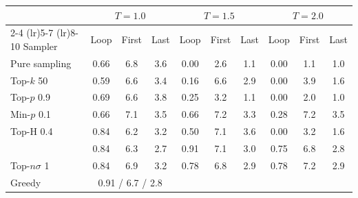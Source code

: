 \begin{tabular}{lccccccccc}
\toprule
 & \multicolumn{3}{c}{$T{=}1.0$} & \multicolumn{3}{c}{$T{=}1.5$} & \multicolumn{3}{c}{$T{=}2.0$} \\
\cmidrule(lr){2-4} \cmidrule(lr){5-7} \cmidrule(lr){8-10}
Sampler & Loop & First & Last & Loop & First & Last & Loop & First & Last \\
\midrule
Pure sampling & 0.66 & 6.8 & 3.6 & 0.00 & 2.6 & 1.1 & 0.00 & 1.1 & 1.0 \\
Top-$k$ 50 & 0.59 & 6.6 & 3.4 & 0.16 & 6.6 & 2.9 & 0.00 & 3.9 & 1.6 \\
Top-$p$ 0.9 & 0.69 & 6.6 & 3.8 & 0.25 & 3.2 & 1.1 & 0.00 & 2.0 & 1.0 \\
Min-$p$ 0.1 & 0.66 & 7.1 & 3.5 & 0.66 & 7.2 & 3.3 & 0.28 & 7.2 & 3.5 \\
Top-H 0.4 & 0.84 & 6.2 & 3.2 & 0.50 & 7.1 & 3.6 & 0.00 & 3.2 & 1.6 \\
\pless{} & 0.84 & 6.3 & 2.7 & 0.91 & 7.1 & 3.0 & 0.75 & 6.8 & 2.8 \\
Top-$n\sigma$ 1 & 0.84 & 6.9 & 3.2 & 0.78 & 6.8 & 2.9 & 0.78 & 7.2 & 2.9 \\
\midrule
Greedy & \multicolumn{3}{c}{0.91 / 6.7 / 2.8} &  &  &  &  &  &  \\
\bottomrule
\end{tabular}
